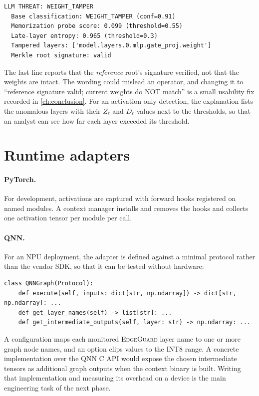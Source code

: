 \begin{lstlisting}[language={},numbers=none,frame=single]
LLM THREAT: WEIGHT_TAMPER
  Base classification: WEIGHT_TAMPER (conf=0.91)
  Memorization probe score: 0.099 (threshold=0.55)
  Late-layer entropy: 0.965 (threshold=0.3)
  Tampered layers: ['model.layers.0.mlp.gate_proj.weight']
  Merkle root signature: valid
\end{lstlisting}

The last line reports that the \emph{reference} root's signature verified, not that the weights
are intact. The wording could mislead an operator, and changing it to ``reference signature
valid; current weights do NOT match'' is a small usability fix recorded in
\cref{ch:conclusion}. For an activation-only detection, the explanation lists the anomalous
layers with their $Z_\ell$ and $D_\ell$ values next to the thresholds, so that an analyst can
see how far each layer exceeded its threshold.

\section{Runtime adapters}
\label{sec:design:adapter}

\paragraph{PyTorch.} For development, activations are captured with forward hooks registered on
named modules. A context manager installs and removes the hooks and collects one activation
tensor per module per call.

\paragraph{QNN.} For an NPU deployment, the adapter is defined against a minimal protocol rather
than the vendor SDK, so that it can be tested without hardware:

\begin{lstlisting}
class QNNGraph(Protocol):
    def execute(self, inputs: dict[str, np.ndarray]) -> dict[str, np.ndarray]: ...
    def get_layer_names(self) -> list[str]: ...
    def get_intermediate_outputs(self, layer: str) -> np.ndarray: ...
\end{lstlisting}

A configuration maps each monitored \textsc{EdgeGuard} layer name to one or more graph node
names, and an option clips values to the INT8 range. A concrete implementation over the QNN C
API would expose the chosen intermediate tensors as additional graph outputs when the context
binary is built. Writing that implementation and measuring its overhead on a device is the main
engineering task of the next phase.
